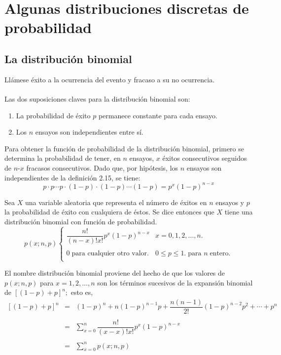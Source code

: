 \chapter{Algunas distribuciones discretas de probabilidad}


\setcounter{section}{1}
\section{La distribución binomial}
Llámese éxito a la ocurrencia del evento y fracaso a su no ocurrencia.\\\\
Las dos suposiciones claves para la distribución binomial son:
\begin{enumerate}
    \item La probabilidad de éxito $p$ permanece constante para cada ensayo.
    \item Los $n$ ensayos son independientes entre sí.
\end{enumerate}

Para obtener la función de probabilidad de la distribución binomial, primero se determina la probabilidad de tener, en $n$ ensayos, $x$ éxitos consecutivos seguidos de $n$-$x$ fracasos consecutivos. Dado que, por hipótesis, los $n$ ensayos son independientes de la definición 2.15, se tiene:
$$p\cdot p\cdots p \cdot (1-p)\cdot (1-p)\cdots (1-p) = p^x(1-p)^{n-x}$$

\begin{tcolorbox}
    \begin{def.}
	Sea $X$ una variable aleatoria que representa el número de éxitos en $n$ ensayos y $p$ la probabilidad de éxito con cualquiera de éstos. Se dice entonces que $X$ tiene una distribución binomial con función de probabilidad.
	$$p(x;n,p)\left\{\begin{array}{ll}
	    \dfrac{n!}{(n-x)!x!} p^x(1-p)^{n-x} & x = 0,1,2,\ldots,n.\\\\
	    0\; \mbox{para cualquier otro valor.} & 0\leq p \leq 1. \; \mbox{para } n \;\mbox{entero}.\\
	\end{array}\right.$$
     \end{def.}
\end{tcolorbox}

El nombre distribución binomial proviene del hecho de que los valores de $p(x;n,p)$ para $x=1,2,\ldots,n$ son los términos sucesivos de la expansión binomial de $[(1-p)+p]^n;$ esto es,
$$\begin{array}{rcl}
    [(1-p)+p]^n & = & (1-p)^n + n(1-p)^{n-1} p + \dfrac{n(n-1)}{2!} (1-p)^{n-2}p^2 + \cdots + p^n\\\\
		& = & \sum\limits_{x=0}^n \dfrac{n!}{(x-x)!x!} p^x(1-p)^{n-x}\\\\
		& = & \sum\limits_{x=0}^n p(x;n,p)\\\\
\end{array}$$

